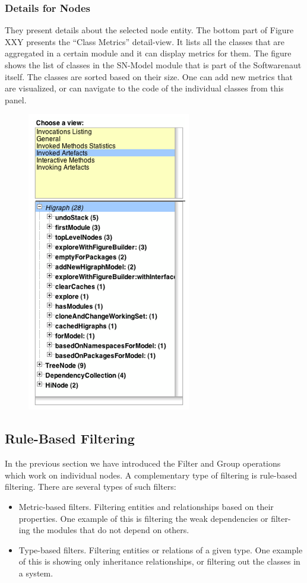 \documentclass[preprint,12pt]{elsarticle}
\begin{document}
\subsubsection {Details for Nodes}

They present details about the selected node entity. The bottom part of Figure XXY presents the “Class Metrics” detail-view. It lists all the classes that are aggregated in a certain module and it can display metrics for them. The figure shows the list of classes in the SN-Model module that is part of the Softwarenaut itself. The classes are sorted based on their size. One can add new metrics that are visualized, or can navigate to the code of the individual classes from this panel.

\begin{figure}[h]
\begin{center}
\includegraphics[width=0.4\linewidth]{images/DetailForEdge.png}
\caption{}
\label{}
\end{center}
\end{figure}


\subsection {Rule-Based Filtering}

In the previous section we have introduced the Filter and Group operations which work on individual nodes. A complementary type of filtering is rule-based filtering. There are several types of such filters:

\begin{itemize}
\item Metric-based filters. Filtering entities and relationships based on their properties. One example of this is filtering the weak dependencies or filter- ing the modules that do not depend on others.
\item Type-based filters. Filtering entities or relations of a given type. One example of this is showing only inheritance relationships, or filtering out the classes in a system.
\end{itemize}
\end{document}
